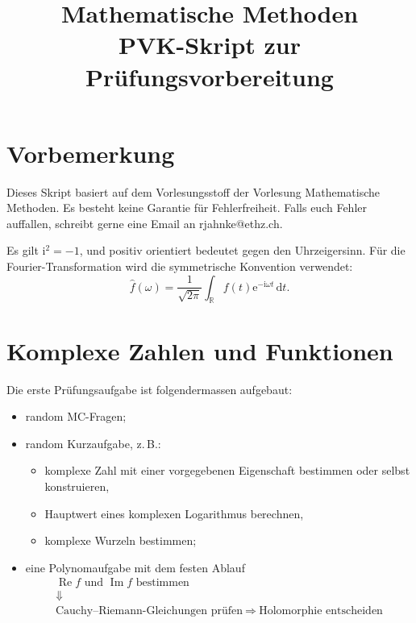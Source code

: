 \documentclass[11pt,a4paper]{article}
\title{\textbf{Mathematische Methoden}\\PVK-Skript zur Prüfungsvorbereitung}
\author{}
\date{}
\newcommand{\R}{\mathbb R}
\newcommand{\ii}{\mathrm i}
\newcommand{\ee}{\mathrm e}
\newcommand{\dd}{\,\mathrm d}
\newcommand{\Ree}{\operatorname{Re}}
\newcommand{\Imm}{\operatorname{Im}}
\newcommand{\1}{\mathbf 1}
\begin{document}
\maketitle
\tableofcontents
\newpage

\section*{Vorbemerkung}
Dieses Skript basiert auf dem Vorlesungsstoff der Vorlesung Mathematische Methoden. Es besteht keine Garantie für Fehlerfreiheit. Falls euch Fehler auffallen, schreibt gerne eine Email an rjahnke@ethz.ch.

\begin{importantbox}[title=Konventionen]
Es gilt $\ii^2=-1$, und positiv orientiert bedeutet gegen den Uhrzeigersinn.
Für die Fourier-Transformation wird die symmetrische Konvention verwendet:
\[
\widehat f(\omega)=\frac1{\sqrt{2\pi}}\int_{\R}f(t)\ee^{-\ii\omega t}\dd t.
\]
\end{importantbox}

\section{Komplexe Zahlen und Funktionen}

\begin{pruefungsbox}[title=Aufbau der ersten Prüfungsaufgabe]
Die erste Prüfungsaufgabe ist folgendermassen aufgebaut:
\begin{itemize}
\item random MC-Fragen;
\item random Kurzaufgabe, z.\,B.:
  \begin{itemize}
  \item komplexe Zahl mit einer vorgegebenen Eigenschaft bestimmen oder selbst
  konstruieren,
  \item Hauptwert eines komplexen Logarithmus berechnen,
  \item komplexe Wurzeln bestimmen;
  \end{itemize}
\item eine Polynomaufgabe mit dem festen Ablauf
\[
\begin{gathered}
\Ree f\text{ und }\Imm f\text{ bestimmen}\\[-1mm]
\Downarrow\\[-1mm]
\text{Cauchy--Riemann-Gleichungen prüfen}
\ \Longrightarrow\
\text{Holomorphie entscheiden}
\end{gathered}
\]
\end{itemize}
\end{pruefungsbox}
\end{document}
